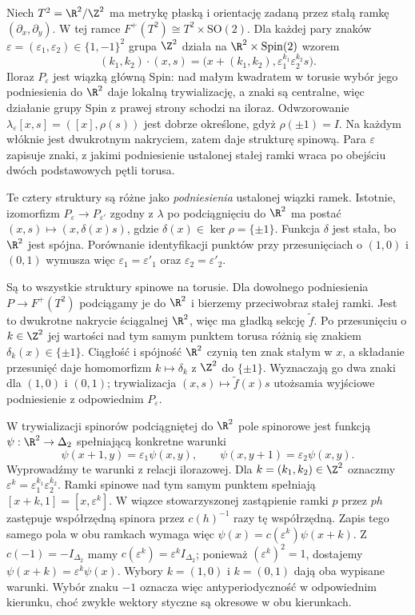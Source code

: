 \begin{przyklad}
\label{prz:spin-torus}
Niech $T^2=\R^2/\Z^2$ ma metrykę płaską i orientację
zadaną przez stałą ramkę $(\partial_x,\partial_y)$.
W tej ramce $F^+(T^2)\cong T^2\times\mathrm{SO}(2)$.
Dla każdej pary znaków
$\varepsilon=(\varepsilon_1,\varepsilon_2)\in\{1,-1\}^2$
grupa $\Z^2$ działa na $\R^2\times\operatorname{Spin}(2)$ wzorem
\[
 (k_1,k_2)\cdot(x,s)
  =\bigl(x+(k_1,k_2),
          \varepsilon_1^{k_1}\varepsilon_2^{k_2}s\bigr).
\]
Iloraz $P_\varepsilon$ jest wiązką główną Spin:
nad małym kwadratem w torusie wybór jego podniesienia do $\R^2$
daje lokalną trywializację, a znaki są centralne,
więc działanie grupy Spin z prawej strony schodzi na iloraz.
Odwzorowanie
$\lambda_\varepsilon[x,s]=([x],\rho(s))$
jest dobrze określone, gdyż $\rho(\pm1)=I$.
Na każdym włóknie jest dwukrotnym nakryciem, zatem daje
strukturę spinową. Para $\varepsilon$ zapisuje znaki,
z jakimi podniesienie ustalonej stałej ramki wraca
po obejściu dwóch podstawowych pętli torusa.

Te cztery struktury są różne jako \emph{podniesienia}
ustalonej wiązki ramek. Istotnie, izomorfizm
$P_\varepsilon\to P_{\varepsilon'}$ zgodny z $\lambda$
po podciągnięciu do $\R^2$ ma postać
$(x,s)\mapsto(x,\delta(x)s)$, gdzie
$\delta(x)\in\ker\rho=\{\pm1\}$.
Funkcja $\delta$ jest stała, bo $\R^2$ jest spójna.
Porównanie identyfikacji punktów przy przesunięciach
o $(1,0)$ i $(0,1)$ wymusza więc
$\varepsilon_1=\varepsilon'_1$ oraz
$\varepsilon_2=\varepsilon'_2$.

Są to wszystkie struktury spinowe na torusie. Dla dowolnego
podniesienia $P\to F^+(T^2)$ podciągamy je do $\R^2$ i bierzemy
przeciwobraz stałej ramki. Jest to dwukrotne nakrycie
ściągalnej $\R^2$, więc ma gładką sekcję $\widetilde f$.
Po przesunięciu o $k\in\Z^2$ jej wartości nad tym samym
punktem torusa różnią się znakiem $\delta_k(x)\in\{\pm1\}$.
Ciągłość i spójność $\R^2$ czynią ten znak stałym w $x$,
a składanie przesunięć daje homomorfizm
$k\mapsto\delta_k$ z $\Z^2$ do $\{\pm1\}$.
Wyznaczają go dwa znaki dla $(1,0)$ i $(0,1)$;
trywializacja $(x,s)\mapsto\widetilde f(x)s$ utożsamia
wyjściowe podniesienie z odpowiednim $P_\varepsilon$.

W trywializacji spinorów podciągniętej do $\R^2$
pole spinorowe jest funkcją $\psi:\R^2\to\Delta_2$
spełniającą konkretne warunki
\[
 \psi(x+1,y)=\varepsilon_1\psi(x,y),
 \qquad
 \psi(x,y+1)=\varepsilon_2\psi(x,y).
\]
Wyprowadźmy te warunki z relacji ilorazowej.
Dla $k=(k_1,k_2)\in\Z^2$ oznaczmy
$\varepsilon^k=\varepsilon_1^{k_1}\varepsilon_2^{k_2}$.
Ramki spinowe nad tym samym punktem spełniają
$[x+k,1]=[x,\varepsilon^k]$.
W wiązce stowarzyszonej zastąpienie ramki $p$ przez $p h$
zastępuje współrzędną spinora przez $c(h)^{-1}$ razy tę współrzędną.
Zapis tego samego pola w obu ramkach wymaga więc
$\psi(x)=c(\varepsilon^k)\psi(x+k)$.
Z $c(-1)=-I_{\Delta_2}$ mamy
$c(\varepsilon^k)=\varepsilon^k I_{\Delta_2}$;
ponieważ $(\varepsilon^k)^2=1$, dostajemy
$\psi(x+k)=\varepsilon^k\psi(x)$.
Wybory $k=(1,0)$ i $k=(0,1)$ dają oba wypisane warunki.
Wybór znaku $-1$ oznacza więc antyperiodyczność
w odpowiednim kierunku, choć zwykłe wektory styczne
są okresowe w obu kierunkach.
\end{przyklad}

